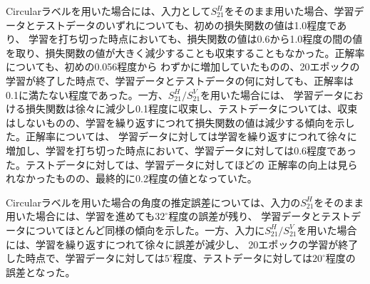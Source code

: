 \documentclass[11pt,a4paper,uplatex]{ujarticle}
\begin{document}
  Circularラベルを用いた場合には、入力として$S_21^H$をそのまま用いた場合、学習データとテストデータのいずれについても、初めの損失関数の値は1.0程度であり、
  学習を打ち切った時点においても、損失関数の値は0.6から1.0程度の間の値を取り、損失関数の値が大きく減少することも収束することもなかった。正解率についても、初めの0.056程度から
  わずかに増加していたものの、20エポックの学習が終了した時点で、学習データとテストデータの何に対しても、正解率は0.1に満たない程度であった。一方、$S_21^H/S_21^V$を用いた場合には、
  学習データにおける損失関数は徐々に減少し0.1程度に収束し、テストデータについては、収束はしないものの、学習を繰り返すにつれて損失関数の値は減少する傾向を示した。正解率については、
  学習データに対しては学習を繰り返すにつれて徐々に増加し、学習を打ち切った時点において、学習データに対しては0.6程度であった。テストデータに対しては、学習データに対してほどの
  正解率の向上は見られなかったものの、最終的に0.2程度の値となっていた。

  Circularラベルを用いた場合の角度の推定誤差については、入力の$S_21^H$をそのまま用いた場合には、学習を進めても$32^{\circ}$程度の誤差が残り、
  学習データとテストデータについてほとんど同様の傾向を示した。一方、入力に$S_21^H/S_21^V$を用いた場合には、学習を繰り返すにつれて徐々に誤差が減少し、
  20エポックの学習が終了した時点で、学習データに対しては$5^{\circ}$程度、テストデータに対しては$20^{\circ}$程度の誤差となった。
\end{document}
